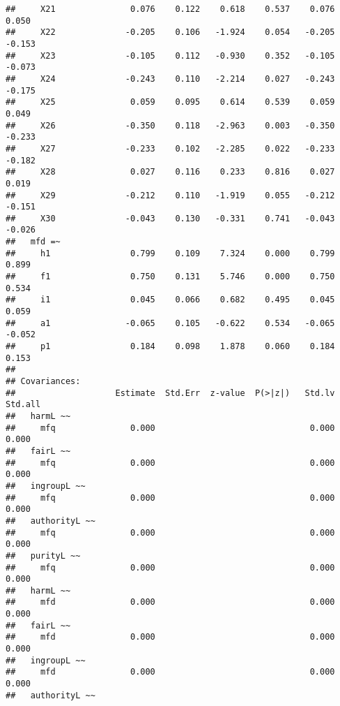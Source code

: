 \documentclass[english,man]{apa6}
\newcounter{author}
\theoremstyle{definition}
\theoremstyle{definition}
\theoremstyle{definition}
\theoremstyle{remark}
\begin{document}
\begin{verbatim}
##     X21               0.076    0.122    0.618    0.537    0.076    0.050
##     X22              -0.205    0.106   -1.924    0.054   -0.205   -0.153
##     X23              -0.105    0.112   -0.930    0.352   -0.105   -0.073
##     X24              -0.243    0.110   -2.214    0.027   -0.243   -0.175
##     X25               0.059    0.095    0.614    0.539    0.059    0.049
##     X26              -0.350    0.118   -2.963    0.003   -0.350   -0.233
##     X27              -0.233    0.102   -2.285    0.022   -0.233   -0.182
##     X28               0.027    0.116    0.233    0.816    0.027    0.019
##     X29              -0.212    0.110   -1.919    0.055   -0.212   -0.151
##     X30              -0.043    0.130   -0.331    0.741   -0.043   -0.026
##   mfd =~                                                                
##     h1                0.799    0.109    7.324    0.000    0.799    0.899
##     f1                0.750    0.131    5.746    0.000    0.750    0.534
##     i1                0.045    0.066    0.682    0.495    0.045    0.059
##     a1               -0.065    0.105   -0.622    0.534   -0.065   -0.052
##     p1                0.184    0.098    1.878    0.060    0.184    0.153
## 
## Covariances:
##                    Estimate  Std.Err  z-value  P(>|z|)   Std.lv  Std.all
##   harmL ~~                                                              
##     mfq               0.000                               0.000    0.000
##   fairL ~~                                                              
##     mfq               0.000                               0.000    0.000
##   ingroupL ~~                                                           
##     mfq               0.000                               0.000    0.000
##   authorityL ~~                                                         
##     mfq               0.000                               0.000    0.000
##   purityL ~~                                                            
##     mfq               0.000                               0.000    0.000
##   harmL ~~                                                              
##     mfd               0.000                               0.000    0.000
##   fairL ~~                                                              
##     mfd               0.000                               0.000    0.000
##   ingroupL ~~                                                           
##     mfd               0.000                               0.000    0.000
##   authorityL ~~                                                         

\end{verbatim}
\end{document}
